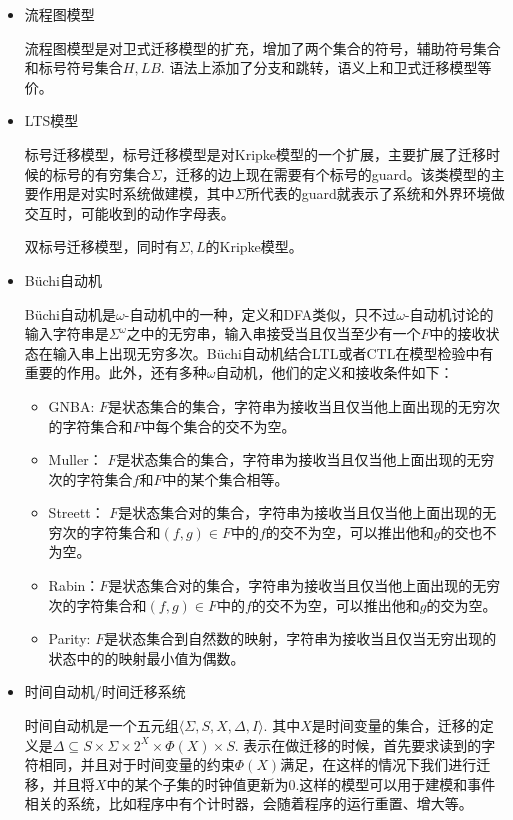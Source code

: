 \documentclass[UTF-8]{ctexart}
\begin{document}
\begin{enumerate}
\begin{itemize}
\item 流程图模型

流程图模型是对卫式迁移模型的扩充，增加了两个集合的符号，辅助符号集合和标号符号集合$H,LB$. 语法上添加了分支和跳转，语义上和卫式迁移模型等价。

\item LTS模型

标号迁移模型，标号迁移模型是对Kripke模型的一个扩展，主要扩展了迁移时候的标号的有穷集合$\Sigma$，迁移的边上现在需要有个标号的guard。该类模型的主要作用是对实时系统做建模，其中$\Sigma$所代表的guard就表示了系统和外界环境做交互时，可能收到的动作字母表。

双标号迁移模型，同时有$\Sigma,L$的Kripke模型。

\item B\"uchi自动机

B\"uchi自动机是$\omega$-自动机中的一种，定义和DFA类似，只不过$\omega$-自动机讨论的输入字符串是$\Sigma^\omega$之中的无穷串，输入串接受当且仅当至少有一个$F$中的接收状态在输入串上出现无穷多次。B\"uchi自动机结合LTL或者CTL在模型检验中有重要的作用。此外，还有多种$\omega$自动机，他们的定义和接收条件如下：
\begin{itemize}

\item GNBA: $F$是状态集合的集合，字符串为接收当且仅当他上面出现的无穷次的字符集合和$F$中每个集合的交不为空。

\item Muller： $F$是状态集合的集合，字符串为接收当且仅当他上面出现的无穷次的字符集合$f$和$F$中的某个集合相等。

\item Streett： $F$是状态集合对的集合，字符串为接收当且仅当他上面出现的无穷次的字符集合和$(f,g)\in F$中的$f$的交不为空，可以推出他和$g$的交也不为空。

\item Rabin：$F$是状态集合对的集合，字符串为接收当且仅当他上面出现的无穷次的字符集合和$(f,g)\in F$中的$f$的交不为空，可以推出他和$g$的交为空。

\item Parity: $F$是状态集合到自然数的映射，字符串为接收当且仅当无穷出现的状态中的的映射最小值为偶数。

\end{itemize}


\item 时间自动机/时间迁移系统

时间自动机是一个五元组$\langle \Sigma, S,X,\Delta, I\rangle$. 其中$X$是时间变量的集合，迁移的定义是$\Delta \subseteq S\times \Sigma \times 2^X \times \Phi(X) \times S$. 表示在做迁移的时候，首先要求读到的字符相同，并且对于时间变量的约束$\Phi(X)$满足，在这样的情况下我们进行迁移，并且将$X$中的某个子集的时钟值更新为$0$.这样的模型可以用于建模和事件相关的系统，比如程序中有个计时器，会随着程序的运行重置、增大等。


\end{itemize}
\end{enumerate}
\end{document}
